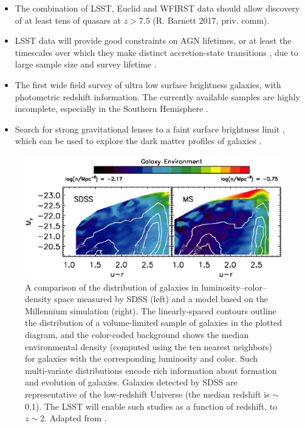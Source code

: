 \begin{itemize}
\item The combination of LSST, Euclid and WFIRST data should allow discovery of at least
       tens of quasars at $z>7.5$ (R. Barnett 2017, priv. comm).
\item LSST data will provide good constraints on AGN lifetimes, or at least the timescales over which
         they make distinct accretion-state transitions \citep{2016MNRAS.457..389M}, due to large sample
         size and survey lifetime \citep[e.g.][]{2003ApJ...597L.109M}.
\item The first wide field survey of ultra low surface brightness galaxies, with
      photometric redshift information. The currently available
      samples \citep[e.g.][]{2018ApJ...857..104G} are highly
      incomplete, especially in the Southern Hemisphere \citep[see Fig.~7 in][]{2007ApJ...654..897B}.
\item Search for strong gravitational lenses to a faint surface
  brightness limit \citep[e.g.][]{1998A&A...330....1B,1998ApJ...498L.107T,2007ApJ...671L...9B}, which can be used to
  explore the dark matter profiles of galaxies \citep[e.g.,][]{2006ApJ...640..662T}.
\end{itemize}


\begin{figure}
\includegraphics[width=1.0\hsize,clip]{cowan}
\caption{A comparison of the distribution of galaxies in
luminosity--color--density space measured by SDSS (left) and a model based
on the Millennium simulation (right). The linearly-spaced contours outline
the distribution of a volume-limited sample of galaxies in the plotted diagram, and
the color-coded background shows the median environmental density (computed
using the ten nearest neighbors) for galaxies
with the corresponding luminosity and color. Such multi-variate distributions
encode rich information about formation and evolution of galaxies. Galaxies
detected by SDSS are representative of the low-redshift Universe (the median
redshift is $\sim$0.1). The LSST will enable such studies as a function of
redshift, to $z\sim$2. Adapted from \citet{2008ApJ...674L..13C}.}
\label{Fig:cowan}
\end{figure}


